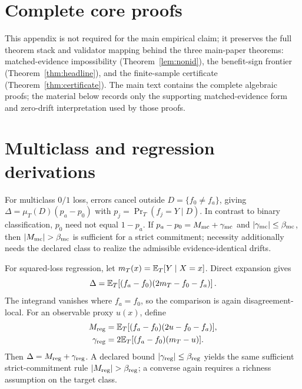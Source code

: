 \section{Complete core proofs}\label{app:theory-full}
This appendix is not required for the main empirical claim; it preserves the full theorem stack
and validator mapping behind the three main-paper theorems: matched-evidence impossibility
(Theorem~\ref{lem:nonid}), the benefit-sign frontier (Theorem~\ref{thm:headline}), and the
finite-sample certificate (Theorem~\ref{thm:certificate}).
The main text contains the complete algebraic proofs; the material below records only the supporting
matched-evidence form and zero-drift interpretation used by those proofs.







\section{Multiclass and regression derivations}\label{app:regression}
For multiclass $0/1$ loss, errors cancel outside $D=\{f_0\neq f_a\}$, giving
$\Delta=\mu_T(D)(p_a-p_0)$ with $p_j=\Pr_T(f_j=Y\mid D)$. In contrast to binary classification,
$p_0$ need not equal $1-p_a$. If $p_a-p_0=M_{\rm mc}+\gamma_{\rm mc}$ and
$|\gamma_{\rm mc}|\le\beta_{\rm mc}$, then $|M_{\rm mc}|>\beta_{\rm mc}$ is sufficient for a
strict commitment; necessity additionally needs the declared class to realize the admissible
evidence-identical drifts.

For squared-loss regression, let $m_T(x)=\mathbb{E}_T[Y\mid X=x]$. Direct expansion gives
\[
\Delta=\mathbb{E}_T\!\left[(f_a-f_0)(2m_T-f_0-f_a)\right].
\]
The integrand vanishes where $f_a=f_0$, so the comparison is again disagreement-local. For an
observable proxy $u(x)$, define
\begin{align*}
M_{\rm reg}&=\mathbb{E}_T[(f_a-f_0)(2u-f_0-f_a)],\\
\gamma_{\rm reg}&=2\mathbb{E}_T[(f_a-f_0)(m_T-u)].
\end{align*}
Then $\Delta=M_{\rm reg}+\gamma_{\rm reg}$. A declared bound
$|\gamma_{\rm reg}|\le\beta_{\rm reg}$ yields the same sufficient strict-commitment rule
$|M_{\rm reg}|>\beta_{\rm reg}$; a converse again requires a richness assumption on the target class.


